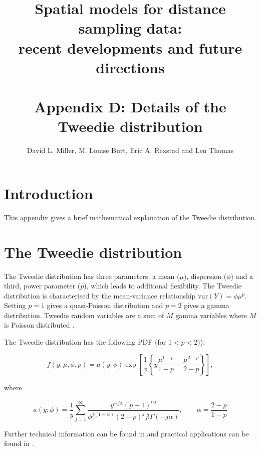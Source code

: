 \documentclass[11pt]{amsart}
\title{{\Small Spatial models for distance sampling data:\\ recent developments and future directions}\\ \mbox{} \\ Appendix D: Details of the Tweedie distribution}
\author{David L. Miller, M. Louise Burt, Eric A. Rexstad and Len Thomas}
\begin{document}
\maketitle


\section{Introduction}

This appendix gives a brief mathematical explanation of the Tweedie distribution.

\section{The Tweedie distribution}

The Tweedie distribution has three parameters: a mean ($\mu$), dispersion ($\phi$) and a third, power parameter ($p$), which leads to additional flexibility. The Tweedie distribution is characterised by the mean-variance relationship $\text{var}(Y) = \phi\mu^p$. Setting $p=1$ gives a quasi-Poisson distribution and $p=2$ gives a gamma distribution. Tweedie random variables are a sum of $M$ gamma variables where $M$ is Poisson distributed \citep{Jorgensen:1987vg}.

The Tweedie distribution has the following PDF (for $1<p<2)$):

\begin{equation*}
f(y; \mu, \phi, p) = a(y;\phi)\exp \left [ \frac{1}{\phi} \left\{ y\frac{\mu^{1-p}}{1-p} - \frac{\mu^{2-p}}{2-p} \right \} \right ],
\end{equation*}

where

\begin{equation*}
a(y;\phi) = \frac{1}{y} \sum_{j=1}^\infty \frac{y^{-j\alpha}{(p-1)^{\alpha j}}}{\phi^{j(1-\alpha)} (2-p)^j j! \Gamma(-j\alpha)}, \qquad \alpha = \frac{2-p}{1-p}
\end{equation*}

Further technical information can be found in \cite{Jorgensen:1987vg,Dunn:2005wp} and practical applications can be found in \cite{Candy:2004tb, Shono:2008ge, Peel:2012jc}.




\end{document}
